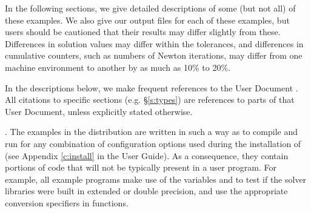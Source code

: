 \vspace{0.2in}\noindent 
In the following sections, we give detailed descriptions of some (but
not all) of these examples.  We also give our output files for
each of these examples, but users should be cautioned that their
results may differ slightly from these.  Differences in solution
values may differ within the tolerances, and differences in cumulative
counters, such as numbers of Newton iterations, may differ
from one machine environment to another by as much as 10\% to 20\%.

In the descriptions below, we make frequent references to the {\kinsol}
User Document \cite{kinsol_ug}.  All citations to specific sections
(e.g. \S\ref{s:types}) are references to parts of that User Document, unless
explicitly stated otherwise.

\vspace{0.2in}. 
The examples in the {\kinsol} distribution are written in such a way as
to compile and run for any combination of configuration options used during
the installation of {\sundials} (see Appendix \ref{c:install} in the User Guide).
As a consequence, they contain portions of code that will not be typically present in a
user program. For example, all {\CC} example programs make use of the
variables  and 
to test if the solver libraries were built in extended or double precision, 
and use the appropriate conversion specifiers in  functions.

